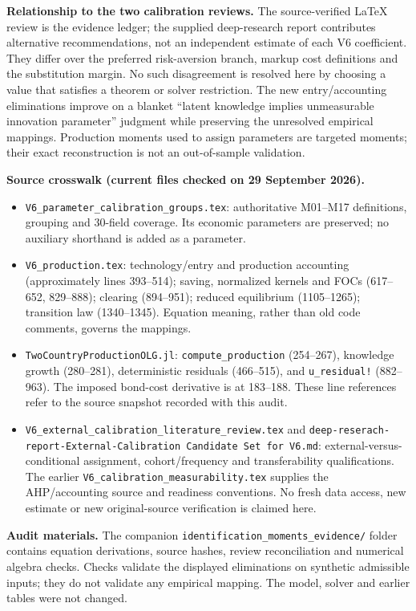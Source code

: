 \documentclass[10pt,a4paper,landscape]{article}
\begin{document}
\textbf{Relationship to the two calibration reviews.} The source-verified LaTeX review is the evidence ledger; the supplied deep-research report contributes alternative recommendations, not an independent estimate of each V6 coefficient. They differ over the preferred risk-aversion branch, markup cost definitions and the substitution margin. No such disagreement is resolved here by choosing a value that satisfies a theorem or solver restriction. The new entry/accounting eliminations improve on a blanket ``latent knowledge implies unmeasurable innovation parameter'' judgment while preserving the unresolved empirical mappings. Production moments used to assign parameters are targeted moments; their exact reconstruction is not an out-of-sample validation.

\textbf{Source crosswalk (current files checked on 29 September 2026).}
\begin{itemize}
\item \texttt{V6\_parameter\_calibration\_groups.tex}: authoritative M01--M17 definitions, grouping and 30-field coverage. Its economic parameters are preserved; no auxiliary shorthand is added as a parameter.
\item \texttt{V6\_production.tex}: technology/entry and production accounting (approximately lines 393--514); saving, normalized kernels and FOCs (617--652, 829--888); clearing (894--951); reduced equilibrium (1105--1265); transition law (1340--1345). Equation meaning, rather than old code comments, governs the mappings.
\item \texttt{TwoCountryProductionOLG.jl}: \texttt{compute\_production} (254--267), knowledge growth (280--281), deterministic residuals (466--515), and \texttt{u\_residual!} (882--963). The imposed bond-cost derivative is at 183--188. These line references refer to the source snapshot recorded with this audit.
\item \texttt{V6\_external\_calibration\_literature\_review.tex} and \texttt{deep-reserach-report-External-Calibration Candidate Set for V6.md}: external-versus-conditional assignment, cohort/frequency and transferability qualifications. The earlier \texttt{V6\_calibration\_measurability.tex} supplies the AHP/accounting source and readiness conventions. No fresh data access, new estimate or new original-source verification is claimed here.
\end{itemize}
\textbf{Audit materials.} The companion \texttt{identification\_moments\_evidence/} folder contains equation derivations, source hashes, review reconciliation and numerical algebra checks. Checks validate the displayed eliminations on synthetic admissible inputs; they do not validate any empirical mapping. The model, solver and earlier tables were not changed.
\end{document}
